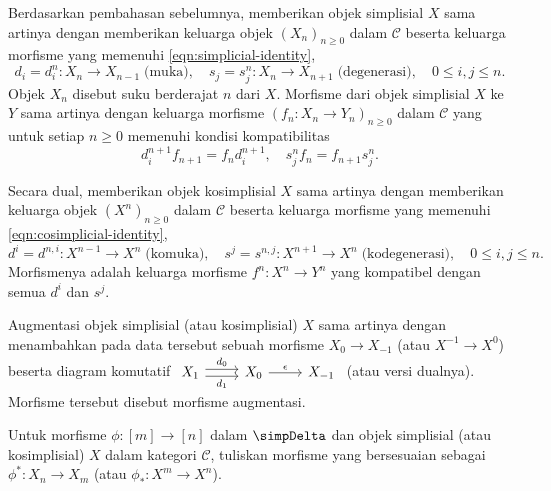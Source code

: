 Berdasarkan pembahasan sebelumnya, memberikan objek simplisial $X$ sama
artinya dengan memberikan keluarga objek $(X_n)_{n\geq0}$ dalam
$\mathcal{C}$ beserta keluarga morfisme yang memenuhi
\eqref{eqn:simplicial-identity},
\[ d_i = d^n_i: X_n \to X_{n-1} \; \text{(muka)}, \quad s_j = s^n_j: X_n \to X_{n+1} \; \text{(degenerasi)}, \quad 0 \leq i, j \leq n. \]
Objek $X_n$ disebut suku berderajat $n$ dari $X$. Morfisme dari objek
simplisial $X$ ke $Y$ sama artinya dengan keluarga morfisme
$(f_n:X_n\to Y_n)_{n\geq0}$ dalam $\mathcal{C}$ yang untuk setiap $n\geq0$
memenuhi kondisi kompatibilitas
\[ d^{n+1}_i f_{n+1} = f_n d^{n+1}_i, \quad s^n_j f_n = f_{n+1} s^n_j . \]

Secara dual, memberikan objek kosimplisial $X$ sama artinya dengan memberikan
keluarga objek $(X^n)_{n\geq0}$ dalam $\mathcal{C}$ beserta keluarga
morfisme yang memenuhi \eqref{eqn:cosimplicial-identity},
\[ d^i = d^{n, i}: X^{n-1} \to X^n \; \text{(komuka)}, \quad s^j = s^{n, j}: X^{n+1} \to X^n \; \text{(kodegenerasi)}, \quad 0 \leq i, j \leq n. \]
Morfismenya adalah keluarga morfisme $f^n:X^n\to Y^n$ yang kompatibel
dengan semua $d^i$ dan $s^j$.

Augmentasi objek simplisial (atau kosimplisial) $X$ sama artinya dengan
menambahkan pada data tersebut sebuah morfisme $X_0\to X_{-1}$ (atau
$X^{-1}\to X^0$) beserta diagram komutatif
$\begin{tikzcd}
	X_1 \arrow[shift left, r, "d_0"] \arrow[shift right, r, "d_1"'] & X_0 \arrow[r, "\epsilon"] & X_{-1}
\end{tikzcd}$
(atau versi dualnya). Morfisme tersebut disebut morfisme augmentasi.

\begin{convention}
	Untuk morfisme $\phi:[m]\to[n]$ dalam $\simpDelta$ dan objek simplisial
	(atau kosimplisial) $X$ dalam kategori $\mathcal{C}$, tuliskan morfisme
	yang bersesuaian sebagai $\phi^*:X_n\to X_m$ (atau
	$\phi_*:X^m\to X^n$).
\end{convention}

